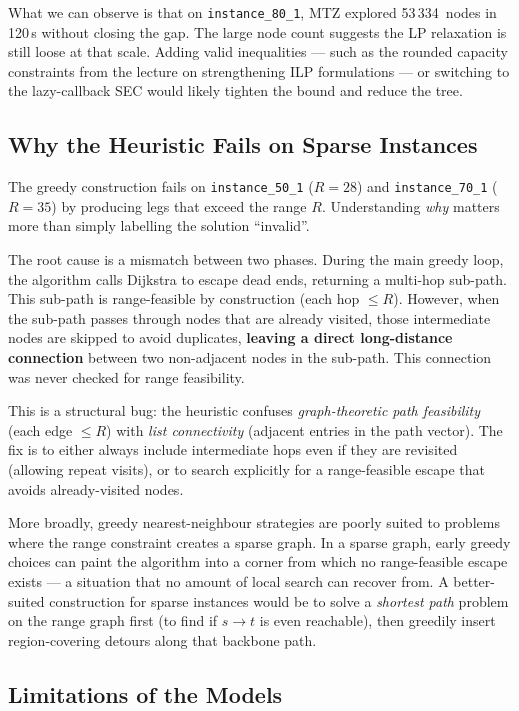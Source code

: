 \documentclass[12pt, a4paper]{article}
\begin{document}
What we can observe is that on \texttt{instance\_80\_1}, MTZ explored 53\,334~nodes
in 120\,s without closing the gap. The large node count suggests the LP relaxation
is still loose at that scale. Adding valid inequalities --- such as the rounded
capacity constraints from the lecture on strengthening ILP formulations ---
or switching to the lazy-callback SEC would likely tighten the bound and reduce the
tree.

\subsection{Why the Heuristic Fails on Sparse Instances}

The greedy construction fails on \texttt{instance\_50\_1} ($R=28$) and
\texttt{instance\_70\_1} ($R=35$) by producing legs that exceed the range $R$.
Understanding \emph{why} matters more than simply labelling the solution ``invalid''.

The root cause is a mismatch between two phases. During the main greedy loop, the
algorithm calls Dijkstra to escape dead ends, returning a multi-hop sub-path. This
sub-path is range-feasible by construction (each hop $\leq R$). However, when the
sub-path passes through nodes that are already visited, those intermediate nodes are
skipped to avoid duplicates, \textbf{leaving a direct long-distance connection}
between two non-adjacent nodes in the sub-path. This connection was never checked
for range feasibility.

This is a structural bug: the heuristic confuses \emph{graph-theoretic path
feasibility} (each edge $\leq R$) with \emph{list connectivity} (adjacent entries
in the path vector). The fix is to either always include intermediate hops even if
they are revisited (allowing repeat visits), or to search explicitly for a
range-feasible escape that avoids already-visited nodes.

More broadly, greedy nearest-neighbour strategies are poorly suited to problems
where the range constraint creates a sparse graph. In a sparse graph, early greedy
choices can paint the algorithm into a corner from which no range-feasible escape
exists --- a situation that no amount of local search can recover from. A
better-suited construction for sparse instances would be to solve a \emph{shortest
path} problem on the range graph first (to find if $s \to t$ is even reachable),
then greedily insert region-covering detours along that backbone path.

\subsection{Limitations of the Models}
\end{document}
